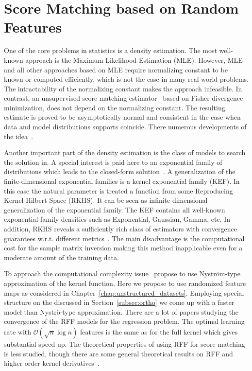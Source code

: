 \section{Score Matching based on Random Features}
\label{sec:score_matching}

One of the core problems in statistics is a density estimation.
The most well-known approach is the Maximum Likelihood Estimation (MLE).
However, MLE and all other approaches based on MLE require normalizing constant to be known
or computed efficiently, which is not the case in many real world problems.
The intractability of the normalizing constant makes the approach infeasible.
In contrast, an unsupervised score matching estimator~\cite{Hyvarinen2005} based on Fisher divergence minimization, does not depend on the normalizing constant.
The resulting estimate is proved to be asymptotically normal and consistent in the case when
data and model distributions supports coincide.
There numerous developments of the
 idea~\cite{hyvarinen2007some, Lyu2012, Gutmann2012bregman, Kanti2016, dai2018kernel}.

Another important part of the density estimation is the class of models to search the solution in.
A special interest is paid here to an exponential family of distributions which leads to the
closed-form solution~\cite{hyvarinen2007some, forbes2015linear, Lin2016, Shiqing2018, monti2018}.
A generalization of the finite-dimensional exponential families is a kernel exponential family
(KEF).
In this case the natural parameter is treated a function from some
Reproducing Kernel Hilbert Space (RKHS).
It can be seen as infinite-dimensional generalization of the exponential family.
The KEF contains all well-known exponential family densities such as Exponential, Gaussian,
Gamma, etc.
In addition, RKHS reveals a sufficiently rich class of
estimators with convergence guarantees w.r.t. different
metrics~\cite{Gretton2013, Gretton2015}.
The main disadvantage is the computational cost for the sample matrix inversion making this
method inapplicable even for a moderate amount of the training data.

To approach the computational complexity issue~\cite{sutherland2017efficient, GrettonDeep} propose to use Nystr{\"o}m-type approximation of the kernel function.
Here we propose to use randomized feature maps as considered in
Chapter~\ref{chap:unstructured_datasets}.
Employing special structure on the discussed in Section~\ref{subsec:ortho}
we come up with a faster model than Nystr{\"o}-type approximation.
There are a lot of papers studying the convergence of the RFF models for the regression problem.
The optimal learning rate with $\mathcal{O}(\sqrt{n}\log n)$ features is the same as for the
full kernel \cite{aless2016generalization}
which gives substantial speed up.
The theoretical properties of using RFF for score matching is less studied,
though there are some general theoretical results on RFF and
higher order kernel derivatives~\cite{Orlicz,OperatorValuedKernels}.

